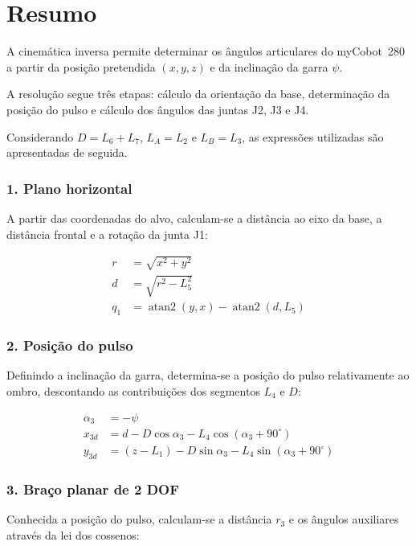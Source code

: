 
\section{Resumo}
\label{sec:ik_resumo}

A cinemática inversa permite determinar os ângulos articulares do myCobot~280 a partir da posição pretendida $(x,y,z)$ e da inclinação da garra $\psi$.

A resolução segue três etapas: cálculo da orientação da base, determinação da posição do pulso e cálculo dos ângulos das juntas J2, J3 e J4.

Considerando $D=L_6+L_7$, $L_A=L_2$ e $L_B=L_3$, as expressões utilizadas são apresentadas de seguida.

\subsubsection*{1. Plano horizontal}

A partir das coordenadas do alvo, calculam-se a distância ao eixo da base, a distância frontal e a rotação da junta J1:

\begin{align*}
    r &= \sqrt{x^2+y^2}\\
    d &= \sqrt{r^2-L_5^2}\\
    q_1 &= \operatorname{atan2}(y,x)
    -\operatorname{atan2}(d,L_5)
\end{align*}

\subsubsection*{2. Posição do pulso}

Definindo a inclinação da garra, determina-se a posição do pulso relativamente ao ombro, descontando as contribuições dos segmentos $L_4$ e $D$:

\begin{align*}
    \alpha_3 &= -\psi\\
    x_{3d} &= d-D\cos\alpha_3
    -L_4\cos(\alpha_3+90^\circ)\\
    y_{3d} &= (z-L_1)-D\sin\alpha_3
    -L_4\sin(\alpha_3+90^\circ)
\end{align*}

\subsubsection*{3. Braço planar de 2 DOF}

Conhecida a posição do pulso, calculam-se a distância $r_3$ e os ângulos auxiliares através da lei dos cossenos:

